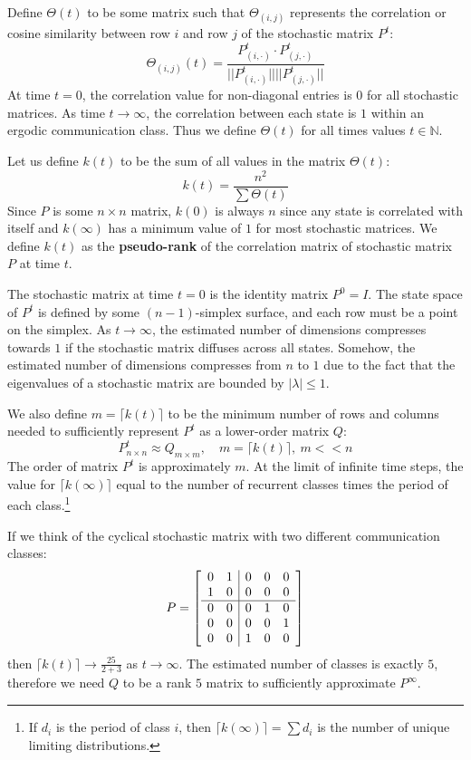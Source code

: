 \documentclass[10pt, a5paper, twoside, openright]{memoir}
\begin{document}
Define $\Theta(t)$ to be some matrix such that $\Theta_{(i,j)}$ represents the correlation or cosine similarity between row $i$ and row $j$ of the stochastic matrix $P^t$:
$$\Theta_{(i,j)}(t) = \frac{ P^t_{(i, \cdot)} \cdot P^t_{(j, \cdot)} }{ ||P^t_{(i, \cdot)}|| ||P^t_{(j, \cdot)} ||}$$
At time $t=0$, the correlation value for non-diagonal entries is $0$ for all stochastic matrices. As time $t \rightarrow \infty$, the correlation between each state is $1$ within an ergodic communication class. Thus we define $\Theta(t)$ for all times values $t \in \mathbb N$.

Let us define $k(t)$ to be the sum of all values in the matrix $\Theta(t)$:
$$k(t) = \frac{n^2}{\sum \Theta(t)}$$
Since $P$ is some $n \times n$ matrix, $k(0)$ is always $n$ since any state is correlated with itself and $k(\infty)$ has a minimum value of $1$ for most stochastic matrices. We define $k(t)$ as the \textbf{pseudo-rank} of the correlation matrix of stochastic matrix $P$ at time $t$. 

The stochastic matrix at time $t=0$ is the identity matrix $P^0 = I$. The state space of $P^t$ is defined by some $(n-1)$-simplex surface, and each row must be a point on the simplex. As $t \rightarrow \infty$, the estimated number of dimensions compresses towards $1$ if the stochastic matrix diffuses across all states. Somehow, the estimated number of dimensions compresses from $n$ to $1$ due to the fact that the eigenvalues of a stochastic matrix are bounded by $|\lambda| \leq 1$.

We also define $m=\lceil k(t) \rceil$ to be the minimum number of rows and columns needed to sufficiently represent $P^t$ as a lower-order matrix $Q$:
$$P_{n \times n}^t \approx Q_{m \times m}, \quad m = \lceil k(t) \rceil, \ m << n$$
The order of matrix $P^t$ is approximately $m$. At the limit of infinite time steps, the value for $\lceil k(\infty) \rceil$ equal to the number of recurrent classes times the period of each class.\footnote{If $d_i$ is the period of class $i$, then $\lceil k(\infty) \rceil = \sum d_i$ is the number of unique limiting distributions.}

If we think of the cyclical stochastic matrix with two different communication classes:
\[P = 
\left[ \begin{array}{c c|c c c}
0 & 1 & 0 & 0 & 0 \\
1 & 0 & 0 & 0 & 0 \\
\hline
0 & 0 & 0 & 1 & 0 \\
0 & 0 & 0 & 0 & 1 \\
0 & 0 & 1 & 0 & 0
\end{array} \right]
\]
then $\lceil k(t) \rceil \rightarrow \frac{25}{2+3}$ as $t \rightarrow \infty$. The estimated number of classes is exactly $5$, therefore we need $Q$ to be a rank $5$ matrix to sufficiently approximate $P^{\infty}$.
\end{document}
